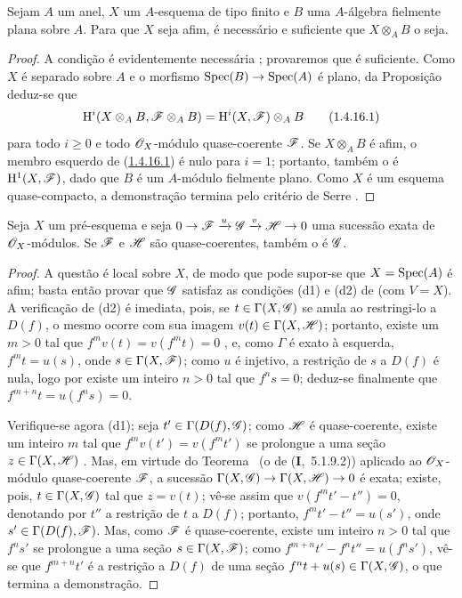 \begin{corollary}[1.4.16]
\label{III.1.4.16}
Sejam $A$ um anel, $X$ um $A$-esquema de tipo finito e $B$ uma $A$-álgebra fielmente plana sobre $A$.
Para que $X$ seja afim, é necessário e suficiente que $X\otimes_A B$ o seja.
\end{corollary}

\begin{proof}
A condição é evidentemente necessária ; provaremos que é suficiente.
Como $X$ é separado sobre $A$ e o morfismo $\Spec(B)\to\Spec(A)$ é plano, da Proposição~ deduz-se que
\[
\label{III.1.4.16.1}
  \HH^i(X\otimes_A B,\sh{F}\otimes_A B)=\HH^i(X,\sh{F})\otimes_A B
  \tag{1.4.16.1}
\]
para todo $i\geq 0$ e todo $\mathscr{O}_X$-módulo quase-coerente $\mathscr{F}$.
Se $X\otimes_A B$ é afim, o membro esquerdo de (\hyperref[III.1.4.16.1]{1.4.16.1}) é nulo para $i=1$; portanto, também o é $\mathrm{H}^1(X,\mathscr{F})$, dado que $B$ é um $A$-módulo fielmente plano.
Como $X$ é um esquema quase-compacto, a demonstração termina pelo critério de Serre .
\end{proof}

\begin{proposition}[1.4.17]
\label{III.1.4.17}
Seja $X$ um pré-esquema e seja $0\to\sh{F}\xrightarrow{u}\sh{G}\xrightarrow{v}\sh{H}\to 0$ uma sucessão exata de $\mathscr{O}_X$-módulos.
Se $\mathscr{F}$ e $\mathscr{H}$ são quase-coerentes, também o é $\mathscr{G}$.
\end{proposition}

\begin{proof}
A questão é local sobre $X$, de modo que pode supor-se que $X=\operatorname{Spec}(A)$ é afim; basta então provar que $\mathscr{G}$ satisfaz as condições (d1) e (d2) de  (com $V=X$).
A verificação de (d2) é imediata, pois, se $t\in\Gamma(X,\mathscr{G})$ se anula ao restringi-lo a $D(f)$, o mesmo ocorre com sua imagem $v(t)\in\Gamma(X,\mathscr{H})$; portanto, existe um $m>0$ tal que $f^m v(t)=v(f^m t)=0$ , e, como $\Gamma$ é exato à esquerda, $f^m t=u(s)$, onde $s\in\Gamma(X,\mathscr{F})$; como $u$ é injetivo, a restrição de $s$ a $D(f)$ é nula, logo por  existe um inteiro $n>0$ tal que $f^n s=0$; deduz-se finalmente que $f^{m+n}t=u(f^n s)=0$.

Verifique-se agora (d1); seja $t'\in\Gamma(D(f),\mathscr{G})$; como $\mathscr{H}$ é quase-coerente, existe um inteiro $m$ tal que $f^m v(t')=v(f^m t')$ se prolongue a uma seção $z\in\Gamma(X,\mathscr{H})$ .
Mas, em virtude do Teorema~ (o de (\textbf{I},~5.1.9.2)) aplicado ao $\mathscr{O}_X$-módulo quase-coerente $\mathscr{F}$, a sucessão $\Gamma(X,\sh{G})\to\Gamma(X,\sh{H})\to 0$ é exata; existe, pois, $t\in\Gamma(X,\mathscr{G})$ tal que $z=v(t)$; vê-se assim que $v(f^m t'-t'')=0$, denotando por $t''$ a restrição de $t$ a $D(f)$; portanto, $f^m t'-t''=u(s')$, onde $s'\in\Gamma(D(f),\mathscr{F})$.
Mas, como $\mathscr{F}$ é quase-coerente, existe um inteiro $n>0$ tal que $f^n s'$ se prolongue a uma seção $s\in\Gamma(X,\mathscr{F})$; como $f^{m+n}t'-f^n t''=u(f^n s')$, vê-se que $f^{m+n}t'$ é a restrição a $D(f)$ de uma seção $f^n t+u(s)\in\Gamma(X,\mathscr{G})$, o que termina a demonstração.
\end{proof}
